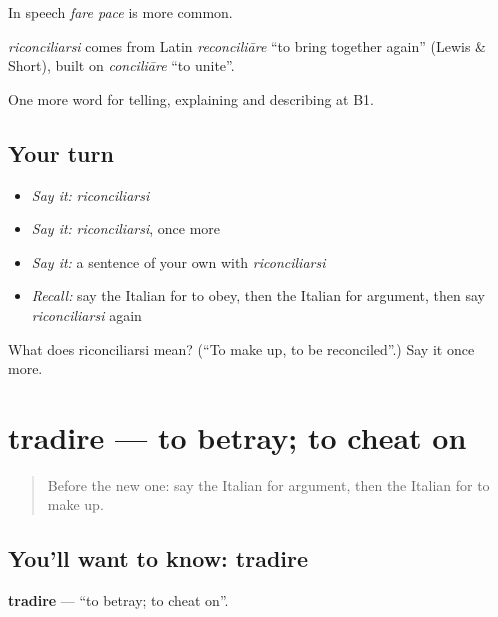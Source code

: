 In speech \emph{fare pace} is more common.

\begin{cousinweb}
\emph{riconciliarsi} comes from Latin \emph{reconciliāre} \textquotedblleft{}to bring together again\textquotedblright{} (Lewis \& Short), built on \emph{conciliāre} \textquotedblleft{}to unite\textquotedblright{}.
\end{cousinweb}

\begin{grammarlens}[title={What you've built}]
One more word for telling, explaining and describing at B1.
\end{grammarlens}

\subsection*{Your turn}
\begin{itemize}
\raggedright
  \item \emph{Say it:} \emph{riconciliarsi}
  \item \emph{Say it:} \emph{riconciliarsi}, once more
  \item \emph{Say it:} a sentence of your own with \emph{riconciliarsi}
  \item \emph{Recall:} say the Italian for to obey, then the Italian for argument, then say \emph{riconciliarsi} again
\end{itemize}

\begin{tcolorbox}[breakable,colback=teal!4,colframe=teal!35!black,title={Before you move on}]
What does riconciliarsi mean? (\textquotedblleft{}To make up, to be reconciled\textquotedblright{}.) Say it once more.
\end{tcolorbox}
\section[tradire]{tradire — to betray; to cheat on}

\label{lesson:IT-C499-tradire}



\begin{quote}
Before the new one: say the Italian for argument, then the Italian for to make up.
\end{quote}

\subsection*{You'll want to know: tradire}
\textbf{tradire} — \textquotedblleft{}to betray; to cheat on\textquotedblright{}.

